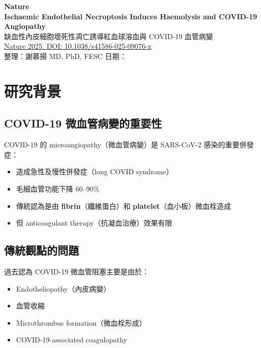 \documentclass[12pt,a4paper]{article}
\begin{document}
\begin{center}
{\LARGE\bfseries\textcolor{emergency_red}{Nature}}\\[0.5cm]
{\Large\textbf{Ischaemic Endothelial Necroptosis Induces Haemolysis and COVID-19 Angiopathy}}\\[0.3cm]
{\large 缺血性內皮細胞壞死性凋亡誘導紅血球溶血與 COVID-19 血管病變}\\[0.5cm]
{\normalsize \href{https://doi.org/10.1038/s41586-025-09076-x}{Nature 2025. DOI: 10.1038/s41586-025-09076-x}}\\[0.3cm]
{\normalsize 整理：謝慕揚 MD, PhD, FESC \quad 日期：\mydate}
\end{center}

\vspace{0.5cm}

\section{研究背景}

\subsection{COVID-19 微血管病變的重要性}

COVID-19 的 microangiopathy（微血管病變）是 SARS-CoV-2 感染的重要併發症：
\begin{itemize}
    \item 造成急性及慢性併發症（long COVID syndrome）
    \item 毛細血管功能下降 60--90\%
    \item 傳統認為是由 \textbf{fibrin}（纖維蛋白）和 \textbf{platelet}（血小板）微血栓造成
    \item 但 anticoagulant therapy（抗凝血治療）效果有限
\end{itemize}

\subsection{傳統觀點的問題}

過去認為 COVID-19 微血管阻塞主要是由於：
\begin{itemize}
    \item Endotheliopathy（內皮病變）
    \item 血管收縮
    \item Microthrombus formation（微血栓形成）
    \item COVID-19-associated coagulopathy
\end{itemize}
\end{document}
